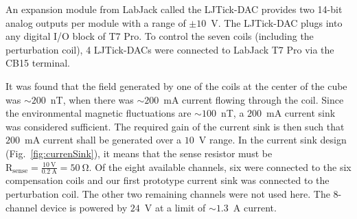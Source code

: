 An expansion module from LabJack called the LJTick-DAC provides two 14-bit analog outputs per module with a range of $\pm10$~V. The LJTick-DAC plugs into any digital I/O block of T7 Pro. To control the seven coils (including the perturbation coil), 4 LJTick-DACs were connected to LabJack T7 Pro via the CB15 terminal. 




It was found that the field generated by one of the coils at the center of the cube was $\sim200$~nT, when there was $\sim200$~mA current flowing through the coil. Since the environmental magnetic fluctuations are $\sim100$~nT, a $200$~mA current sink was considered sufficient. The required gain of the current sink is then such that $200$~mA current shall be generated over a $10$~V range. In the current sink design (Fig.~\ref{fig:currenSink}), it means that the sense resistor must be $\mathrm{R_{sense}=\frac{10~V}{0.2~A}=50~\Omega}$. Of the eight available channels, six were connected to the six compensation coils and our first prototype current sink was connected to the perturbation coil. The other two remaining channels were not used here. The 8-channel device is powered by $24$~V at a limit of $\sim 1.3$~A current. 


